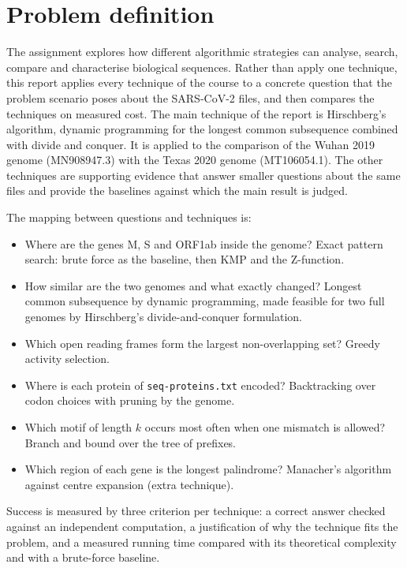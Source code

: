\section{Problem definition}\label{sec:problem}

The assignment explores how different algorithmic strategies can analyse, search, compare and
characterise biological sequences. Rather than apply one technique, this report applies every
technique of the course to a concrete question that the problem scenario poses about the
SARS-CoV-2 files, and then compares the techniques on measured cost. The main technique of the
report is Hirschberg's algorithm, dynamic programming for the longest common subsequence
combined with divide and conquer. It is applied to the comparison of the Wuhan 2019 genome
(MN908947.3) with the Texas 2020 genome (MT106054.1). The other techniques are supporting
evidence that answer smaller questions about the same files and provide the baselines against
which the main result is judged.

The mapping between questions and techniques is:
\begin{itemize}\setlength\itemsep{0pt}
    \item Where are the genes M, S and ORF1ab inside the genome? Exact pattern search: brute force as the baseline, then KMP and the Z-function.
    \item How similar are the two genomes and what exactly changed? Longest common subsequence by dynamic programming, made feasible for two full genomes by Hirschberg's divide-and-conquer formulation.
    \item Which open reading frames form the largest non-overlapping set? Greedy activity selection.
    \item Where is each protein of \texttt{seq-proteins.txt} encoded? Backtracking over codon choices with pruning by the genome.
    \item Which motif of length $k$ occurs most often when one mismatch is allowed? Branch and bound over the tree of prefixes.
    \item Which region of each gene is the longest palindrome? Manacher's algorithm against centre expansion (extra technique).
\end{itemize}

Success is measured by three criterion per technique: a correct answer checked against an independent
computation, a justification of why the technique fits the problem, and a measured running time
compared with its theoretical complexity and with a brute-force baseline.
